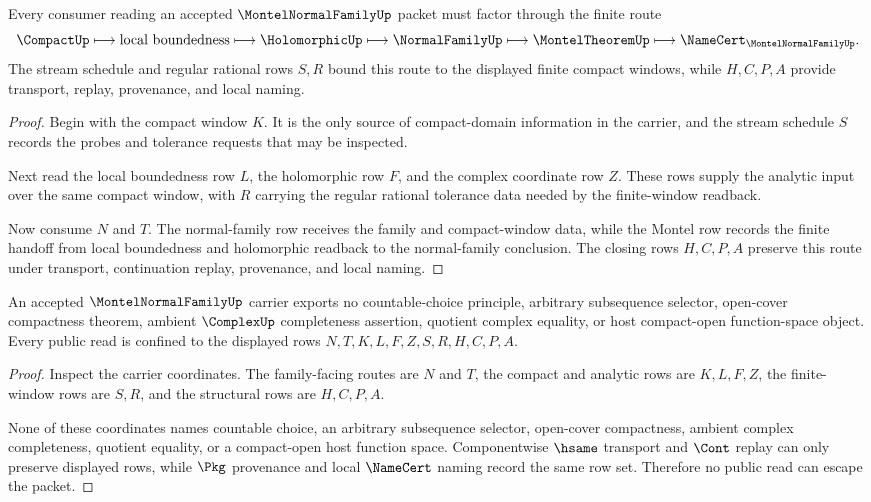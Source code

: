 \begin{theorem}
\label{thm:montel-normal-family-compact-window-handoff}
Every consumer reading an accepted $\MontelNormalFamilyUp$ packet must factor through the finite route
$$
\CompactUp
\longmapsto
\text{local boundedness}
\longmapsto
\HolomorphicUp
\longmapsto
\NormalFamilyUp
\longmapsto
\MontelTheoremUp
\longmapsto
\NameCert_{\MontelNormalFamilyUp}.
$$
The stream schedule and regular rational rows $S,R$ bound this route to the displayed finite compact windows, while $H,C,P,A$ provide transport, replay, provenance, and local naming.
\end{theorem}
\begin{proof}
Begin with the compact window $K$. It is the only source of compact-domain information in the carrier, and the stream schedule $S$ records the probes and tolerance requests that may be inspected.

Next read the local boundedness row $L$, the holomorphic row $F$, and the complex coordinate row $Z$. These rows supply the analytic input over the same compact window, with $R$ carrying the regular rational tolerance data needed by the finite-window readback.

Now consume $N$ and $T$. The normal-family row receives the family and compact-window data, while the Montel row records the finite handoff from local boundedness and holomorphic readback to the normal-family conclusion. The closing rows $H,C,P,A$ preserve this route under transport, continuation replay, provenance, and local naming.
\end{proof}

\begin{theorem}
\label{thm:montel-normal-family-public-nonescape}
An accepted $\MontelNormalFamilyUp$ carrier exports no countable-choice principle, arbitrary subsequence selector, open-cover compactness theorem, ambient $\ComplexUp$ completeness assertion, quotient complex equality, or host compact-open function-space object. Every public read is confined to the displayed rows $N,T,K,L,F,Z,S,R,H,C,P,A$.
\end{theorem}
\begin{proof}
Inspect the carrier coordinates. The family-facing routes are $N$ and $T$, the compact and analytic rows are $K,L,F,Z$, the finite-window rows are $S,R$, and the structural rows are $H,C,P,A$.

None of these coordinates names countable choice, an arbitrary subsequence selector, open-cover compactness, ambient complex completeness, quotient equality, or a compact-open host function space. Componentwise $\hsame$ transport and $\Cont$ replay can only preserve displayed rows, while $\Pkg$ provenance and local $\NameCert$ naming record the same row set. Therefore no public read can escape the packet.
\end{proof}

